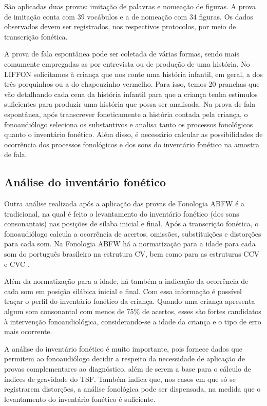 \documentclass[output=paper,colorlinks,citecolor=brown,booklanguage=portuguese]{langscibook}
\begin{document}
São aplicadas duas provas: imitação de palavras e nomeação de figuras. A prova de imitação conta com 39 vocábulos e a de nomeação com 34 figuras.  Os dados observados devem ser registrados, nos respectivos protocolos, por meio de transcrição fonética.

A prova de fala espontânea pode ser coletada de várias formas, sendo mais comumente empregadas as   por entrevista ou de produção de uma história. No LIFFON solicitamos à criança que nos conte uma história infantil, em geral, a dos três porquinhos ou a do chapeuzinho vermelho. Para isso, temos 20 pranchas que vão detalhando cada cena da história infantil para que a criança tenha estímulos suficientes para produzir uma história que possa ser analisada. Na prova de fala espontânea, após transcrever foneticamente a história contada pela criança, o fonoaudiólogo seleciona os substantivos e analisa tanto os processos fonológicos quanto o inventário fonético. Além disso, é necessário calcular as possibilidades de ocorrência dos processos fonológicos e dos sons do inventário fonético na amostra de fala.


\subsection{Análise do inventário fonético}
Outra análise realizada após a aplicação das provas de Fonologia ABFW é a tradicional, na qual é feito o levantamento do inventário fonético (dos sons consonantais) nas posições de sílaba inicial e final. Após a transcrição fonética, o fonoaudiólogo calcula a ocorrência de acertos, omissões, substituições e distorções para cada som. Na Fonologia ABFW há a normatização para a idade para cada som do português brasileiro na estrutura CV, bem como para as estruturas CCV e CVC \citep{Wertzner1992, Wertzner1994, Wertzner2004}.

Além da normatização para a idade, há também a indicação da ocorrência de cada som em posição silábica inicial e final. Com essa informação é possível traçar o perfil do inventário fonético da criança. Quando uma criança apresenta algum som consonantal com menos de 75\% de acertos, esses são fortes candidatos à intervenção fonoaudiológica, considerando-se a idade da criança e o tipo de erro mais ocorrente.

A análise do inventário fonético é muito importante, pois fornece dados que permitem ao fonoaudiólogo decidir a respeito da necessidade de aplicação de provas complementares ao diagnóstico, além de serem a base para o cálculo de índices de gravidade do TSF. Também indica que, nos casos em que só se registrarem distorções, a análise fonológica pode ser dispensada, na medida que o levantamento do inventário fonético é suficiente.
\end{document}
